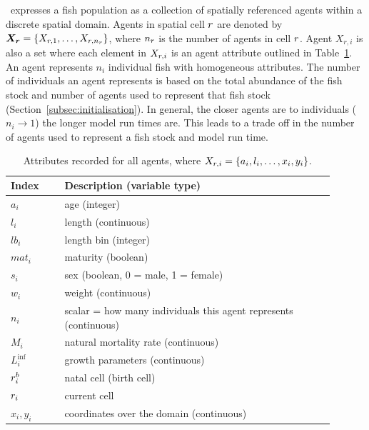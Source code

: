 \subsection{\label{sec:individuals}}
\IBM\ expresses a fish population as a collection of spatially referenced agents within a discrete spatial domain. Agents in spatial cell \(r\) are denoted by \(\bm{X_r} = \{X_{r,1}, \dots, X_{r, n_r}\}\), where \({n_r}\) is the number of agents in cell \(r\). Agent \(X_{r,i}\) is also a set where each element in \(X_{r,i}\) is an agent attribute outlined in Table~\ref{tab:agent_atrtributes}. An agent represents \(n_i\) individual fish with homogeneous attributes. The number of individuals an agent represents is based on the total abundance of the fish stock and number of agents used to represent that fish stock (Section~\ref{subsec:initialisation}). In general, the closer agents are to individuals (\(n_i \rightarrow 1\)) the longer model run times are. This leads to a trade off in the number of agents used to represent a fish stock and model run time.


\begin{table}[H]
	\centering
	\caption{Attributes recorded for all agents, where \(X_{r, i} = \{a_i,l_i, \dots ,  x_i, y_i\}\).}
	\label{tab:agent_atrtributes}
	\begin{tabular}{|p{0.15\linewidth} | p{0.75\linewidth}|}
		\hline
		Index  & Description (variable type) \\ 
		\hline
		\(a_i\) & age (integer) \\
		\(l_i\) & length (continuous)\\	
		\(lb_i\) & length bin (integer)\\
		\(mat_i\) & maturity (boolean)\\	
		\(s_i\) & sex (boolean, 0 = male, 1 = female)\\		
		\(w_i\) & weight (continuous)\\
		\(n_i\) & scalar = how many individuals this agent represents  (continuous)\\		
		\(M_i\) & natural mortality rate (continuous)\\	
		\(L_i^{\inf}\) & growth parameters (continuous)\\	
		\(r^b_i\) & natal cell (birth cell)\\	
		\(r_i\) & current cell\\	
		\(x_i, y_i\) & coordinates over the domain (continuous)	\\
		\hline 		 						
	\end{tabular}
\end{table}

